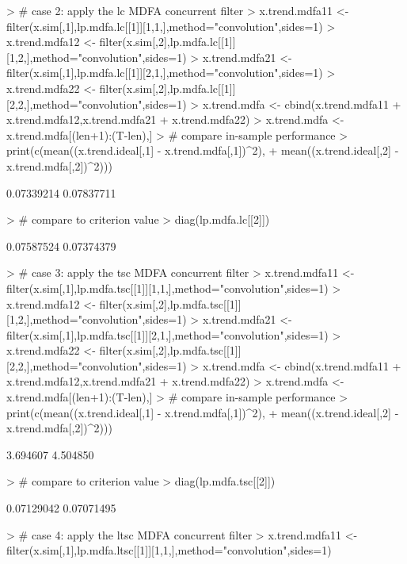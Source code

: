 \documentclass[a4paper]{book}
\begin{document}
\begin{Schunk}
\begin{Sinput}
> # case 2: apply the lc MDFA concurrent filter 
> x.trend.mdfa11 <- filter(x.sim[,1],lp.mdfa.lc[[1]][1,1,],method="convolution",sides=1)
> x.trend.mdfa12 <- filter(x.sim[,2],lp.mdfa.lc[[1]][1,2,],method="convolution",sides=1)
> x.trend.mdfa21 <- filter(x.sim[,1],lp.mdfa.lc[[1]][2,1,],method="convolution",sides=1)
> x.trend.mdfa22 <- filter(x.sim[,2],lp.mdfa.lc[[1]][2,2,],method="convolution",sides=1)
> x.trend.mdfa <- cbind(x.trend.mdfa11 + x.trend.mdfa12,x.trend.mdfa21 + x.trend.mdfa22)
> x.trend.mdfa <- x.trend.mdfa[(len+1):(T-len),] 
> # compare in-sample performance
> print(c(mean((x.trend.ideal[,1] - x.trend.mdfa[,1])^2),
+ 	mean((x.trend.ideal[,2] - x.trend.mdfa[,2])^2)))
\end{Sinput}
\begin{Soutput}
[1] 0.07339214 0.07837711
\end{Soutput}
\begin{Sinput}
> # compare to criterion value
> diag(lp.mdfa.lc[[2]])
\end{Sinput}
\begin{Soutput}
[1] 0.07587524 0.07374379
\end{Soutput}
\begin{Sinput}
> # case 3: apply the tsc MDFA concurrent filter 
> x.trend.mdfa11 <- filter(x.sim[,1],lp.mdfa.tsc[[1]][1,1,],method="convolution",sides=1)
> x.trend.mdfa12 <- filter(x.sim[,2],lp.mdfa.tsc[[1]][1,2,],method="convolution",sides=1)
> x.trend.mdfa21 <- filter(x.sim[,1],lp.mdfa.tsc[[1]][2,1,],method="convolution",sides=1)
> x.trend.mdfa22 <- filter(x.sim[,2],lp.mdfa.tsc[[1]][2,2,],method="convolution",sides=1)
> x.trend.mdfa <- cbind(x.trend.mdfa11 + x.trend.mdfa12,x.trend.mdfa21 + x.trend.mdfa22)
> x.trend.mdfa <- x.trend.mdfa[(len+1):(T-len),] 
> # compare in-sample performance
> print(c(mean((x.trend.ideal[,1] - x.trend.mdfa[,1])^2),
+ 	mean((x.trend.ideal[,2] - x.trend.mdfa[,2])^2)))
\end{Sinput}
\begin{Soutput}
[1] 3.694607 4.504850
\end{Soutput}
\begin{Sinput}
> # compare to criterion value
> diag(lp.mdfa.tsc[[2]])
\end{Sinput}
\begin{Soutput}
[1] 0.07129042 0.07071495
\end{Soutput}
\begin{Sinput}
> # case 4: apply the ltsc MDFA concurrent filter 
> x.trend.mdfa11 <- filter(x.sim[,1],lp.mdfa.ltsc[[1]][1,1,],method="convolution",sides=1)

\end{Sinput}
\end{Schunk}
\end{document}
